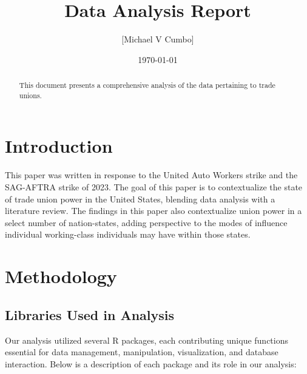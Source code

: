 \documentclass[11pt]{article}\usepackage[]{graphicx}\usepackage[]{xcolor}
\title{Data Analysis Report}
\author{[Michael V Cumbo]}
\date{\today}
\begin{document}
\maketitle

\begin{abstract}
This document presents a comprehensive analysis of the data pertaining to trade unions.
\end{abstract}

\section{Introduction}
This paper was written in response to the United Auto Workers strike and the SAG-AFTRA strike of 2023. The goal of this paper is to contextualize the state of trade union power in the United States, blending data analysis with a literature review. The findings in this paper also contextualize union power in a select number of nation-states, adding perspective to the modes of influence individual working-class individuals may have within those states.

\section{Methodology}
\subsection*{Libraries Used in Analysis}

Our analysis utilized several R packages, each contributing unique functions essential for data management, manipulation, visualization, and database interaction. Below is a description of each package and its role in our analysis:
\end{document}
